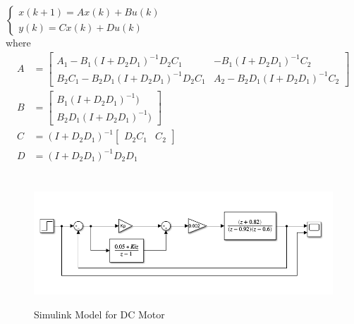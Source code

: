 \documentclass{article}
\begin{document}
$
\left\{
\begin{aligned}
    x(k+1)=Ax(k)+Bu(k)\\
    y(k)=Cx(k)+Du(k)
\end{aligned}
\right.
$\\
where 
\begin{align*}
    A&=
    \begin{bmatrix}
        A_1-B_1(I+D_2D_1)^{-1}D_2C_1&-B_1(I+D_2D_1)^{-1}C_2\\
        B_2C_1-B_2D_1(I+D_2D_1)^{-1}D_2C_1&A_2-B_2D_1(I+D_2D_1)^{-1}C_2
    \end{bmatrix}\\
    B&=
    \begin{bmatrix}
        B_1(I+D_2D_1)^{-1})\\
        B_2D_1(I+D_2D_1)^{-1})
    \end{bmatrix}\\
    C&=(I+D_2D_1)^{-1}
    \begin{bmatrix}
        D_2C_1&C_2
    \end{bmatrix}\\
    D&=(I+D_2D_1)^{-1}D_2D_1
\end{align*}
\section{}
\subsection{}
\begin{figure}[H]
    \centering
        \textsf{\includegraphics[width=0.9\columnwidth]{hw4-fig1.png}}
        \caption{Simulink Model for DC Motor}
        \label{fig: 1}
\end{figure}
\end{document}

